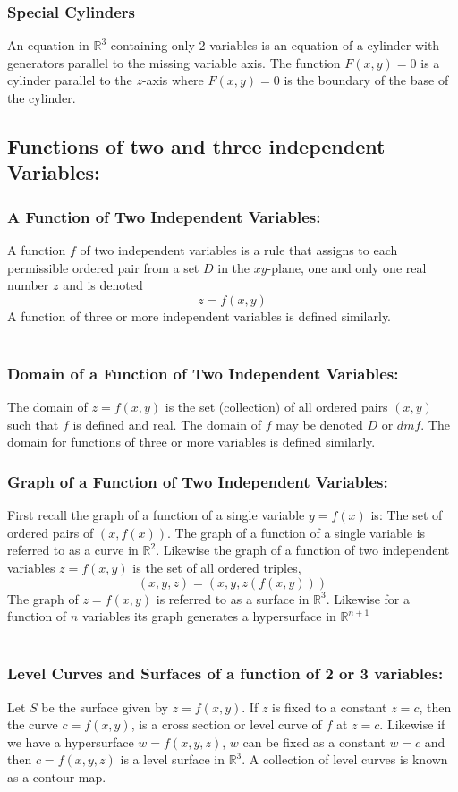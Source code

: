 \documentclass[14pt]{article}
\begin{document}
    \subsubsection{Special Cylinders}
    An equation in $\mathbb{R}^3$ containing only 2 variables is an equation of a cylinder with generators parallel to the missing variable axis. The function $F(x,y)=0$ is a cylinder parallel to the $z$-axis where $F(x,y)=0$ is the boundary of the base of the cylinder.
    \subsection{Functions of two and three independent Variables:}
    \subsubsection{A Function of Two Independent Variables:}
    A function $f$ of two independent variables is a rule that assigns to each permissible ordered pair from a set $D$ in the $xy$-plane, one and only one real number $z$ and is denoted
    $$z=f(x,y)$$
    A function of three or more independent variables is defined similarly.\\\\
    \subsubsection{Domain of a Function of Two Independent Variables:}
    The domain of $z=f(x,y)$ is the set (collection) of all ordered pairs $(x,y)$ such that $f$ is defined and real. The domain of $f$ may be denoted $D$ or $dmf$. The domain for functions of three or more variables is defined similarly.
    \subsubsection{Graph of a Function of Two Independent Variables:}
    First recall the graph of a function of a single variable $y=f(x)$ is: The set of ordered pairs of $(x,f(x))$. The graph of a function of a single variable is referred to as a curve in $\mathbb{R}^2$. Likewise the graph of a function of two independent variables $z=f(x,y)$ is the set of all ordered triples,
    $$(x,y,z)=(x,y,z(f(x,y)))$$
    The graph of $z=f(x,y)$ is referred to as a surface in $\mathbb{R}^3$. Likewise for a function of $n$ variables its graph generates a hypersurface in $\mathbb{R}^{n+1}$\\\\
    \subsubsection{Level Curves and Surfaces of a function of 2 or 3 variables:}
    Let $S$ be the surface given by $z=f(x,y)$. If $z$ is fixed to a constant $z=c$, then the curve $c=f(x,y)$, is a cross section or level curve of $f$ at $z=c$.
    Likewise if we have a hypersurface $w=f(x,y,z)$, $w$ can be fixed as a constant $w=c$ and then $c=f(x,y,z)$ is a level surface in $\mathbb{R}^3$.
    A collection of level curves is known as a contour map.
\end{document}
